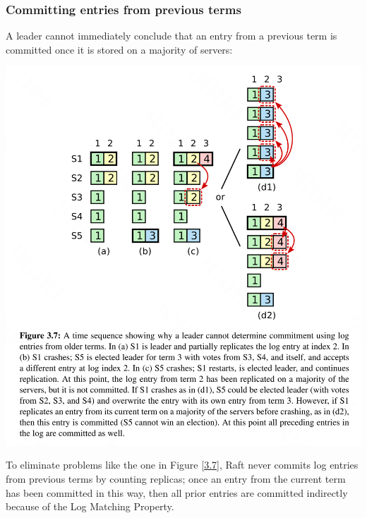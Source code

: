 \documentclass[11pt]{article}
\begin{document}
\subsubsection{Committing entries from previous terms}
\label{sec:org29e9f89}
A leader cannot immediately conclude that an entry from a previous term is committed once it is stored
on a majority of servers:
\begin{center}
\includegraphics[width=.9\textwidth]{../../images/papers/12.png}
\label{3.7}
\end{center}

To eliminate problems like the one in Figure \ref{3.7}, Raft never commits log entries from previous
terms by counting replicas; once an entry from the current term has been committed in this way, then all prior
entries are committed indirectly because of the Log Matching Property.
\end{document}
